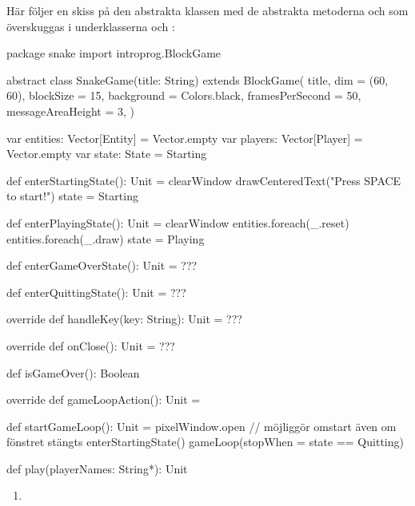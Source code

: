 Här följer en skiss på den abstrakta klassen  med de abstrakta metoderna  och  som överskuggas i underklasserna  och :
\begin{CodeSmall}
package snake
import introprog.BlockGame

abstract class SnakeGame(title: String) extends BlockGame(
  title,
  dim = (60, 60),
  blockSize = 15,
  background = Colors.black,
  framesPerSecond = 50,
  messageAreaHeight = 3,
) {
  var entities: Vector[Entity] = Vector.empty
  var players: Vector[Player] = Vector.empty
  var state: State = Starting

  def enterStartingState(): Unit = {
    clearWindow
    drawCenteredText("Press SPACE to start!")
    state = Starting
  }

  def enterPlayingState(): Unit = {
    clearWindow
    entities.foreach(_.reset)
    entities.foreach(_.draw)
    state = Playing
  }

  def enterGameOverState(): Unit =  ???

  def enterQuittingState(): Unit =  ???

  override def handleKey(key: String): Unit = ???

  override def onClose(): Unit = ???

  def isGameOver(): Boolean

  override def gameLoopAction(): Unit =

  def startGameLoop(): Unit = {
    pixelWindow.open // möjliggör omstart även om fönstret stängts
    enterStartingState()
    gameLoop(stopWhen = state == Quitting)
  }

  def play(playerNames: String*): Unit
}
\end{CodeSmall}


\begin{enumerate}[leftmargin=*]
\item
\end{enumerate}
